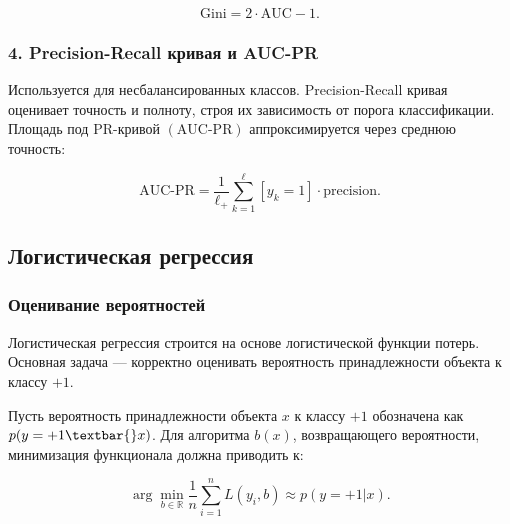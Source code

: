 \begin{equation}
\text{Gini} = 2 \cdot \text{AUC} - 1.
\end{equation}

\hypertarget{precision-recall-ux43aux440ux438ux432ux430ux44f-ux438-auc-pr}{%
\subsubsection*{4. Precision-Recall кривая и
AUC-PR}\label{precision-recall-ux43aux440ux438ux432ux430ux44f-ux438-auc-pr}}

Используется для несбалансированных классов. Precision-Recall кривая
оценивает точность и полноту, строя их зависимость от порога
классификации. Площадь под PR-кривой
\(( \text{AUC-PR} )\) аппроксимируется через среднюю точность:

\begin{equation}
\text{AUC-PR} = \frac{1}{\ell_+} \sum_{k=1}^\ell [y_k = 1] \cdot \text{precision}.
\end{equation}

\hypertarget{ux43bux43eux433ux438ux441ux442ux438ux447ux435ux441ux43aux430ux44f-ux440ux435ux433ux440ux435ux441ux441ux438ux44f}{%
\subsection*{Логистическая
регрессия}\label{ux43bux43eux433ux438ux441ux442ux438ux447ux435ux441ux43aux430ux44f-ux440ux435ux433ux440ux435ux441ux441ux438ux44f}}

\hypertarget{ux43eux446ux435ux43dux438ux432ux430ux43dux438ux435-ux432ux435ux440ux43eux44fux442ux43dux43eux441ux442ux435ux439}{%
\subsubsection*{Оценивание
вероятностей}\label{ux43eux446ux435ux43dux438ux432ux430ux43dux438ux435-ux432ux435ux440ux43eux44fux442ux43dux43eux441ux442ux435ux439}}

Логистическая регрессия строится на основе логистической функции потерь.
Основная задача --- корректно оценивать вероятность принадлежности
объекта к классу \(+1 \).

Пусть вероятность принадлежности объекта \(x \) к классу \(+1
\) обозначена как \(p(y = +1 \textbar{} x) \). Для алгоритма \(b(x) \),
возвращающего вероятности, минимизация функционала должна приводить к:

\begin{equation}
\arg\min_{b \in \mathbb{R}} \frac{1}{n} \sum_{i=1}^n L(y_i, b) \approx p(y = +1 | x).
\end{equation}

